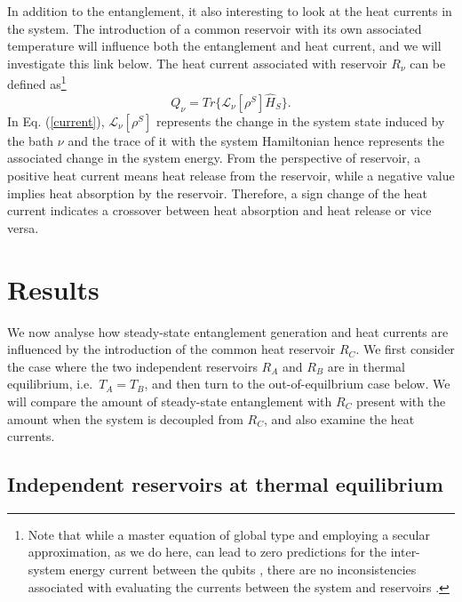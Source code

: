 \documentclass[12pt]{iopart}
\begin{document}
In addition to the entanglement, it also interesting to look at the heat currents in the system. The introduction of a common reservoir with its own associated temperature will influence both the entanglement and heat current, and we will investigate this link below. The heat current associated with reservoir $R_{\nu}$ can be defined as\footnote{Note that while a master equation of global type and employing a secular approximation, as we do here, can lead to zero predictions for the inter-system energy current between the qubits \cite{Wichterich2007}, there are no inconsistencies associated with evaluating the currents between the system and reservoirs \cite{Hofer2017}.} \cite{def-curr1,def-curr2}
\begin{equation}  \label{current}
Q_{\nu}=Tr\{\mathcal{L}_{\nu}[\rho^{S}]\hat{H}_{S}\}.
\end{equation}
In Eq. (\ref{current}), $\mathcal{L}_\nu[\rho^S]$ represents the change in the system state induced by the bath $\nu$ and the trace of it with the system Hamiltonian hence represents the associated change in the system energy.
From the perspective of reservoir, a positive heat current means heat release from the reservoir, while a negative value implies heat absorption by the reservoir. Therefore, a sign change of the heat current indicates a crossover between heat absorption and heat release or vice versa.



\section{Results}

We now analyse how steady-state entanglement generation and heat currents are influenced by the introduction of the common heat reservoir $R_C$. We first consider the case where the two independent reservoirs $R_A$ and $R_B$ are in thermal equilibrium, i.e.~$T_A=T_B$, and then turn to the out-of-equilbrium case below. We will compare the amount of steady-state entanglement with $R_C$ present with the amount when the system is decoupled from $R_C$, and also examine the heat currents.

\subsection{Independent reservoirs at thermal equilibrium}
\end{document}
